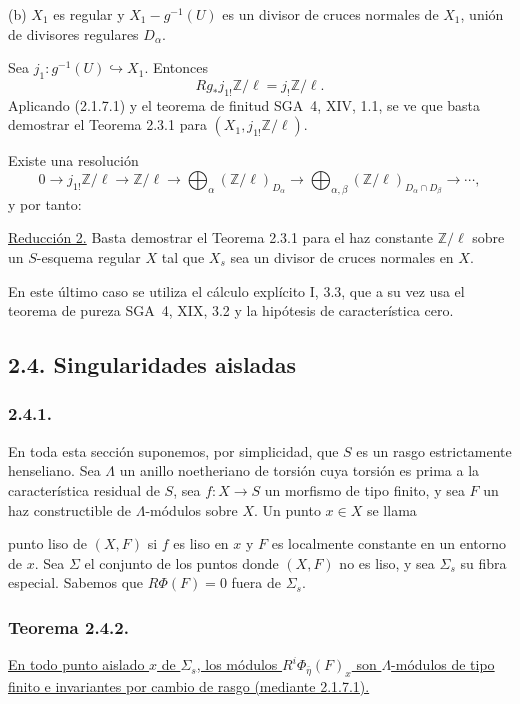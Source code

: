 \noindent(b) $X_1$ es regular y $X_1-g^{-1}(U)$ es un divisor de cruces
normales de $X_1$, unión de divisores regulares $D_\alpha$.

Sea $j_1:g^{-1}(U)\hookrightarrow X_1$. Entonces
\[
Rg_*j_{1!}\mathbb Z/\ell=j_!\mathbb Z/\ell.
\]
Aplicando (2.1.7.1) y el teorema de finitud SGA~4, XIV, 1.1, se ve que basta
demostrar el Teorema 2.3.1 para $(X_1,j_{1!}\mathbb Z/\ell)$.

Existe una resolución
\[
0\longrightarrow j_{1!}\mathbb Z/\ell
\longrightarrow\mathbb Z/\ell
\longrightarrow\bigoplus_\alpha(\mathbb Z/\ell)_{D_\alpha}
\longrightarrow
\bigoplus_{\alpha,\beta}
(\mathbb Z/\ell)_{D_\alpha\cap D_\beta}
\longrightarrow\cdots,
\]
y por tanto:

\medskip
\noindent\underline{Reducción 2.}
Basta demostrar el Teorema 2.3.1 para el haz constante $\mathbb Z/\ell$
sobre un $S$-esquema regular $X$ tal que $X_s$ sea un divisor de cruces
normales en $X$.

En este último caso se utiliza el cálculo explícito I, 3.3, que a su vez usa
el teorema de pureza SGA~4, XIX, 3.2 y la hipótesis de característica cero.

\subsection*{2.4. Singularidades aisladas}

\subsubsection*{2.4.1.}
En toda esta sección suponemos, por simplicidad, que $S$ es un rasgo
estrictamente henseliano. Sea $\Lambda$ un anillo noetheriano de torsión cuya
torsión es prima a la característica residual de $S$, sea
$f:X\longrightarrow S$ un morfismo de tipo finito, y sea $F$ un haz
constructible de $\Lambda$-módulos sobre $X$. Un punto $x\in X$ se llama

\pageoriginale

punto liso de $(X,F)$ si $f$ es liso en $x$ y $F$ es localmente constante en
un entorno de $x$. Sea $\Sigma$ el conjunto de los puntos donde $(X,F)$ no
es liso, y sea $\Sigma_s$ su fibra especial. Sabemos que $R\Phi(F)=0$ fuera
de $\Sigma_s$.

\subsubsection*{Teorema 2.4.2.}
\underline{En todo punto aislado $x$ de $\Sigma_s$, los módulos
$R^i\Phi_{\bar\eta}(F)_x$ son $\Lambda$-módulos de tipo finito e invariantes
por cambio de rasgo (mediante 2.1.7.1).}

